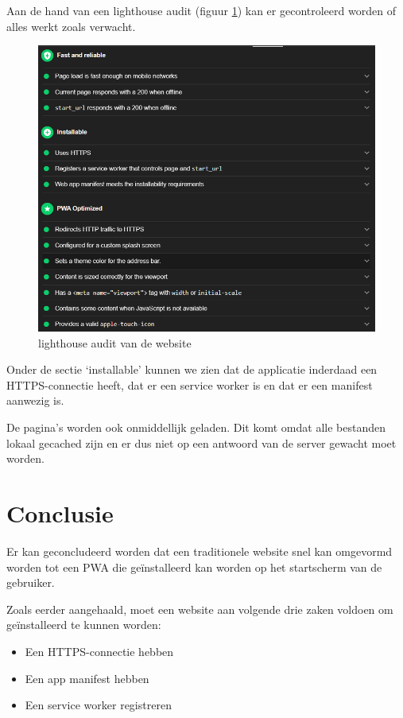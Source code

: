 	Aan de hand van een lighthouse audit (figuur \ref{fig:auditDarts}) kan er gecontroleerd worden of alles werkt zoals verwacht.
	
	\begin{figure}[H]
		\centering
		\includegraphics[width=150mm]{./img/lighthouse_dart.png}{}
		\caption{lighthouse audit van de website}
		\label{fig:auditDarts}
	\end{figure}

	Onder de sectie ‘installable’ kunnen we zien dat de applicatie inderdaad een HTTPS-connectie heeft, dat er een service worker is en dat er een manifest aanwezig is.
	
	De pagina's worden ook onmiddellijk geladen. Dit komt omdat alle bestanden lokaal gecached zijn en er dus niet op een antwoord van de server gewacht moet worden.

\newpage
\section{Conclusie}

	Er kan geconcludeerd worden dat een traditionele website snel kan omgevormd worden tot een PWA die geïnstalleerd kan worden op het startscherm van de gebruiker. 
	
	Zoals eerder aangehaald, moet een website aan volgende drie zaken voldoen om geïnstalleerd te kunnen worden:
	\begin{itemize}
		\item Een HTTPS-connectie hebben
		\item Een app manifest hebben
		\item Een service worker registreren
	\end{itemize}	
	
